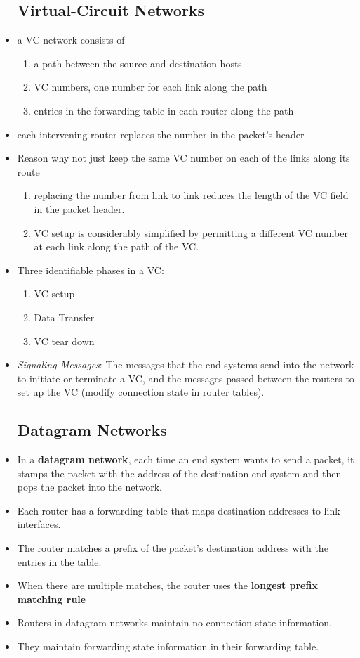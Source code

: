 \documentclass{article}
\begin{document}
\begin{itemize}
\subsection{Virtual-Circuit Networks}
\item a VC network consists of
\begin{enumerate}
\item a path between the source and destination hosts
\item VC numbers, one number for each link along the path
\item entries in the forwarding table in each router along the path
\end{enumerate}
\item each intervening router replaces the number in the packet's
  header
\item Reason why not just keep the same VC number on each of the links
  along its route
\begin{enumerate}
\item replacing the number from link to link reduces the length of the
  VC field in the packet header.
\item VC setup is considerably simplified by permitting a different VC
  number at each link along the path of the VC.
\end{enumerate}
\item Three identifiable phases in a VC:
\begin{enumerate}
\item VC setup
\item Data Transfer
\item VC tear down
\end{enumerate}
\item \emph{Signaling Messages}: The messages that the end systems
  send into the network to initiate or terminate a VC, and the
  messages passed between the routers to set up the VC (modify
  connection state in router tables).
\subsection{Datagram Networks}
\item In a \textbf{datagram network}, each time an end system wants to
  send a packet, it stamps the packet with the address of the
  destination end system and then pops the packet into the network.
\item Each router has a forwarding table that maps destination
addresses to link interfaces.
\item The router matches a prefix of the packet's destination address
  with the entries in the table.
\item When there are multiple matches, the router uses the
  \textbf{longest prefix matching rule}
\item Routers in datagram networks maintain no connection state
  information.
\item They maintain forwarding state information in their forwarding
  table.

\end{itemize}
\end{document}
